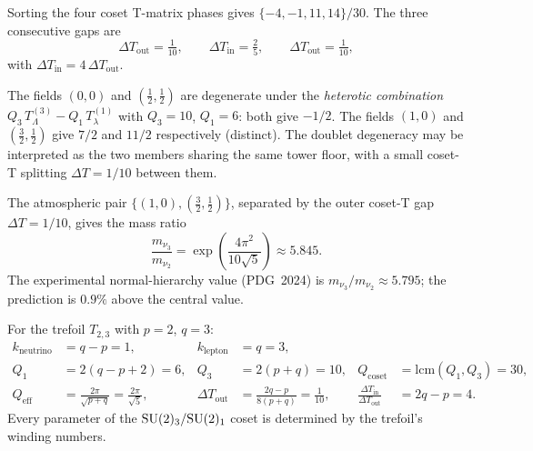 \begin{proposition}
\label{P17:prop:coset_gaps}
Sorting the four coset T-matrix phases gives $\{-4,-1,11,14\}/30$.
The three consecutive gaps are
\begin{equation}
  \Delta T_{\mathrm{out}} = \tfrac{1}{10}, \qquad
  \Delta T_{\mathrm{in}} = \tfrac{2}{5}, \qquad
  \Delta T_{\mathrm{out}} = \tfrac{1}{10},
\end{equation}
with $\Delta T_{\mathrm{in}}=4\,\Delta T_{\mathrm{out}}$.
\end{proposition}

\begin{remark}
\label{P17:rem:degenerate_doublet}
The fields $(0,0)$ and $(\frac{1}{2},\frac{1}{2})$ are degenerate
under the \emph{heterotic combination}
$Q_3\,T^{(3)}_\Lambda - Q_1\,T^{(1)}_\lambda$ with
$Q_3=10$, $Q_1=6$: both give $-1/2$.  The fields
$(1,0)$ and $(\frac{3}{2},\frac{1}{2})$ give $7/2$ and $11/2$
respectively (distinct).  The doublet degeneracy may be interpreted
as the two members sharing the same tower floor, with a small
coset-T splitting $\Delta T=1/10$ between them.
\end{remark}

\begin{proposition}
\label{P17:prop:nu_mass_ratio}
The atmospheric pair $\{(1,0),(\frac{3}{2},\frac{1}{2})\}$,
separated by the outer coset-T gap $\Delta T=1/10$, gives the mass ratio
\begin{equation}
  \frac{m_{\nu_3}}{m_{\nu_2}}
  = \exp\!\left(\frac{4\pi^2}{10\sqrt{5}}\right)
  \approx 5.845.
  \label{P17:eq:m3m2_pred}
\end{equation}
The experimental normal-hierarchy value (PDG~2024) is
$m_{\nu_3}/m_{\nu_2}\approx5.795$; the prediction is $0.9\%$ above
the central value.
\end{proposition}

\begin{proposition}
\label{P17:prop:pq_coset}
For the trefoil $T_{2,3}$ with $p=2$, $q=3$:
\begin{align*}
  k_{\mathrm{neutrino}} &= q-p = 1, &
  k_{\mathrm{lepton}} &= q = 3, \\
  Q_1 &= 2(q-p+2) = 6, &
  Q_3 &= 2(p+q) = 10, &
  Q_{\mathrm{coset}} &= \mathrm{lcm}(Q_1,Q_3) = 30, \\
  Q_{\mathrm{eff}} &= \frac{2\pi}{\sqrt{p+q}} = \frac{2\pi}{\sqrt{5}}, &
  \Delta T_{\mathrm{out}} &= \frac{2q-p}{8(p+q)} = \frac{1}{10}, &
  \frac{\Delta T_{\mathrm{in}}}{\Delta T_{\mathrm{out}}} &= 2q-p = 4.
\end{align*}
Every parameter of the $\mathrm{SU}(2)_3/\mathrm{SU}(2)_1$ coset is determined by
the trefoil's winding numbers.
\end{proposition}

